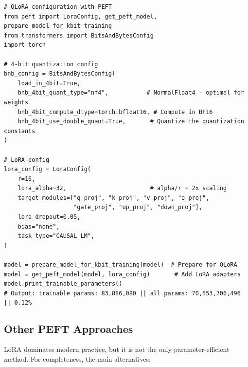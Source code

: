 \begin{lstlisting}[style=pythonstyle]
# QLoRA configuration with PEFT
from peft import LoraConfig, get_peft_model, prepare_model_for_kbit_training
from transformers import BitsAndBytesConfig
import torch

# 4-bit quantization config
bnb_config = BitsAndBytesConfig(
    load_in_4bit=True,
    bnb_4bit_quant_type="nf4",           # NormalFloat4 - optimal for weights
    bnb_4bit_compute_dtype=torch.bfloat16, # Compute in BF16
    bnb_4bit_use_double_quant=True,       # Quantize the quantization constants
)

# LoRA config
lora_config = LoraConfig(
    r=16,
    lora_alpha=32,                        # alpha/r = 2x scaling
    target_modules=["q_proj", "k_proj", "v_proj", "o_proj",
                    "gate_proj", "up_proj", "down_proj"],
    lora_dropout=0.05,
    bias="none",
    task_type="CAUSAL_LM",
)

model = prepare_model_for_kbit_training(model)  # Prepare for QLoRA
model = get_peft_model(model, lora_config)       # Add LoRA adapters
model.print_trainable_parameters()
# Output: trainable params: 83,886,080 || all params: 70,553,706,496 || 0.12%
\end{lstlisting}

\subsection{Other PEFT Approaches}
\label{other-peft-approaches}

LoRA dominates modern practice, but it is not the only parameter-efficient method. For completeness, the main alternatives:

